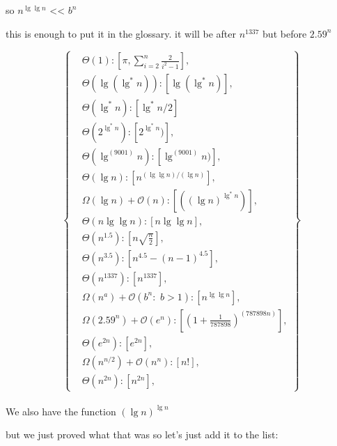 \documentclass[11pt,fleqn]{article}
\theoremstyle{definition}
\theoremstyle{remark}
\begin{document}
so $n^{\lg \lg n}$ << $b^n$

this is enough to put it in the glossary. 
it will be after $n^{1337}$ but before $2.59^n$

\[
\left\{
\begin{aligned}
& \Theta(1): [\pi, \sum_{i=2}^{n} \frac{2}{i^2 - 1}],\\
& \Theta(\lg(\lg^*n)): [\lg(\lg^*n)],\\
& \Theta(\lg^* n): [\lg^* n/2]\\
& \Theta(2^{\lg^*n}): [2^{\lg^*n})],\\
& \Theta(\lg^{(9001)} n): [\lg^{(9001)} n)],\\
& \Theta(\lg n): [n^{({\lg \lg n})/({\lg n})}],\\
& \Omega(\lg n) + \mathcal{O}(n): [({(\lg n)}^{\lg^*{n}})],\\
& \Theta(n\lg \lg n): [n\lg \lg n],\\
& \Theta(n^{1.5}): [n\sqrt{\frac{n}{2}}],\\
& \Theta(n^{3.5}): [n^{4.5} - (n - 1)^{4.5}],\\ 
& \Theta(n^{1337}): [n^{1337}],\\
& \Omega(n^a) + \mathcal{O}(b^n:\,\, b > 1): [n^{\lg \lg n}],\\
& \Omega(2.59^n) + \mathcal{O}(e^n): [{(1 + \frac{1}{787898})}^{(787898n)}],\\
& \Theta(e^{2n}): [e^{2n}],\\
& \Omega(n^{n/2}) + \mathcal{O}(n^n): [n!],\\
& \Theta(n^{2n}): [n^{2n}],
\end{aligned}
\right\}
\]\\

We also have the function $(\lg n)^{\lg n}$

but we just proved what that was so let's just add it to the list:
\end{document}
